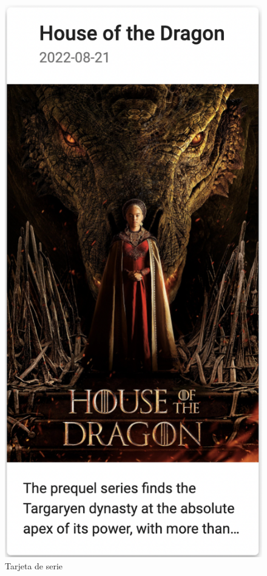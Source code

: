 \begin{figure}[H]
    \centering	
        \includegraphics[scale=0.5]{img/show-card.png}
    \caption{ Tarjeta de serie }\label{fig:show-card}
\end{figure}

